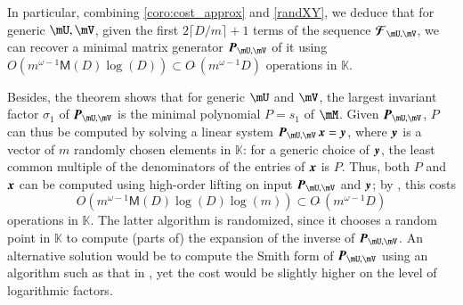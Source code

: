 \documentclass[final,1p,times,authoryear]{elsarticle}
\newcommand{\mat}[1]{\bm{\MakeUppercase{#1}}} %
\newcommand{\col}[1]{\bm{\MakeLowercase{#1}}} %
\newcommand{\seq}{\mat{\mathcal{F}}} %
\newcommand{\softO}[1]{O{\tilde{~}}(#1)} %
\newcommand{\minpoly}{P}
\def\M {\ensuremath{\mathsf{M}}}
\def\K{\mathbb{K}}
\def\K {\ensuremath{\mathbb{K}}}
\begin{document}
In particular, combining \cref{coro:cost_approx} and \cref{randXY}, we
deduce that for generic $\mU,\mV$, given the first $2 \lceil D/m
\rceil+1$ terms of the sequence $\seq_{\mU,\mV}$, we can recover a
minimal matrix generator  $\mat{P}_{\mU,\mV}$ of it using $O(m^{\omega-1} \M(D) \log(D))
\subset \softO{m^{\omega-1} D}$ operations in $\K$.

Besides, the theorem shows that for generic $\mU$ and $\mV$, the
largest invariant factor $\sigma_1$ of $\mat{P}_{\mU,\mV}$ is the
minimal polynomial $\minpoly=s_1$ of $\mM$.  Given $\mat{P}_{\mU,\mV}$,
$\minpoly$ can thus be computed by solving a linear system
$\mat{P}_{\mU,\mV} \, \col{x} = \col{y}$, where $\col{y}$ is a vector of
$m$ randomly chosen elements in $\K$: for a generic choice of
$\col{y}$, the least common multiple of the denominators of the
entries of $\col{x}$ is $\minpoly$.  Thus, both $\minpoly$ and $\col{x}$
can be computed using
high-order lifting \citep[Algorithm~5]{Stor03} on input
$\mat{P}_{\mU,\mV}$ and $\col{y}$; by
\citep[Corollary~16]{Stor03}, this costs
\begin{equation}\label{eqn:hol_cost}
  O(m^{\omega-1} \M(D) \log(D)\log(m)) \subset \softO{m^{\omega-1}D}
  \end{equation}
operations in $\K$.  The latter algorithm is randomized, since it
chooses a random point in $\K$ to compute (parts of) the expansion of
the inverse of $\mat{P}_{\mU,\mV}$. An alternative solution would be
to compute the Smith form of $\mat{P}_{\mU,\mV}$ using an algorithm
such as that in \citep[Section~17]{Stor03}, yet the cost would be
slightly higher on the level of logarithmic factors.


\end{document}
